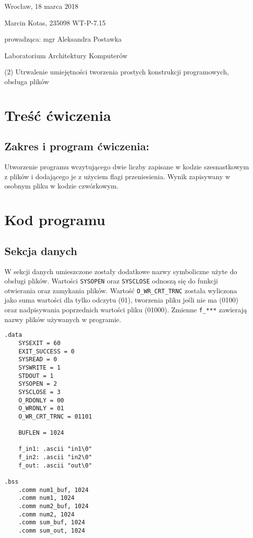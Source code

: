 \documentclass[polish, 11pt]{article}
\begin{document}
	\begin{flushright}
		Wrocław, 18 marca 2018
	\end{flushright}
	
	Marcin Kotas, 235098
	WT-P-7.15
	
	\begin{flushright}
		prowadząca: mgr Aleksandra Postawka
	\end{flushright}
	
	\begin{center}
		Laboratorium Architektury Komputerów
	
		(2)	Utrwalenie umiejętności tworzenia prostych konstrukcji programowych, obsługa plików
	\end{center}
	
	\section{Treść ćwiczenia}
	\subsection*{Zakres i program ćwiczenia:}
		Utworzenie programu wczytującego dwie liczby zapisane w kodzie szesnastkowym z plików
		i dodającego je z użyciem flagi przeniesienia.
		Wynik zapisywany w osobnym pliku w kodzie czwórkowym.
		
	\section{Kod programu}
	\subsection{Sekcja danych}
		
		\begin{minipage}{.5\textwidth}
			W sekcji danych umieszczone zostały dodatkowe nazwy symboliczne użyte do obsługi plików.
			Wartości \texttt{SYSOPEN} oraz \texttt{SYSCLOSE} odnoszą się do funkcji otwierania oraz zamykania plików.
			Wartość \texttt{O\_WR\_CRT\_TRNC} została wyliczona jako suma wartości dla tylko odczytu (01), tworzenia pliku jeśli nie ma (0100) oraz nadpisywania poprzednich wartości pliku (01000).
			Zmienne \texttt{f\_***} zawierają nazwy plików używanych w programie.

		\end{minipage}%
		\hspace{1cm}
		\begin{minipage}{.5\textwidth}	%
			\begin{lstlisting}	
.data
	SYSEXIT = 60
	EXIT_SUCCESS = 0
	SYSREAD = 0
	SYSWRITE = 1
	STDOUT = 1
	SYSOPEN = 2
	SYSCLOSE = 3
	O_RDONLY = 00
	O_WRONLY = 01
	O_WR_CRT_TRNC = 01101

	BUFLEN = 1024

	f_in1: .ascii "in1\0"
	f_in2: .ascii "in2\0"
	f_out: .ascii "out\0"

.bss
	.comm num1_buf, 1024
	.comm num1, 1024
	.comm num2_buf, 1024
	.comm num2, 1024
	.comm sum_buf, 1024
	.comm sum_out, 1024
			\end{lstlisting}	%
		\end{minipage}
\end{document}
